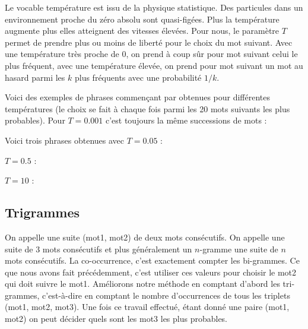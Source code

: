 \documentclass[11pt,class=report,crop=false]{standalone}
\begin{document}
Le vocable \og{}température\fg{} est issu de la physique statistique. Des particules dans un environnement proche du zéro absolu sont quasi-figées. Plus la température augmente plus elles atteignent des vitesses élevées.
Pour nous, le paramètre $T$ permet de prendre plus ou moins de liberté pour le choix du mot suivant. Avec une température très proche de $0$, on prend à coup sûr 
pour mot suivant celui le plus fréquent, avec une température élevée, on prend pour mot suivant un mot au hasard parmi les $k$ plus fréquents avec une probabilité $1/k$.

Voici des exemples de phrases commençant par  obtenues pour différentes températures (le choix se fait à chaque fois parmi les 20 mots suivants les plus probables).
Pour $T=0.001$ c'est toujours la même successions de mots :

Voici trois phrases obtenues avec $T=0.05$ :


$T=0.5$ :



$T = 10$ :



\subsection{Trigrammes}

On appelle  une suite (mot1, mot2) de deux mots consécutifs.
On appelle  une suite de $3$ mots consécutifs et plus généralement un $n$-gramme une suite de $n$ mots consécutifs.
La co-occurrence, c'est exactement compter les bi-grammes. Ce que nous avons fait précédemment, c'est utiliser ces valeurs pour choisir le mot2 qui doit suivre le mot1.
Améliorons notre méthode en comptant d'abord les tri-grammes, c'est-à-dire en comptant le nombre d'occurrences de tous les triplets (mot1, mot2, mot3).
Une fois ce travail effectué, étant donné une paire (mot1, mot2) on peut décider quels sont les mot3 les plus probables.
\end{document}
